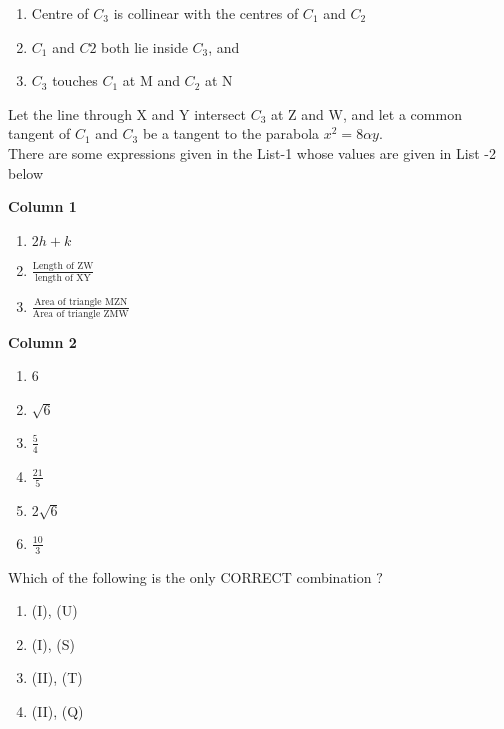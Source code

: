 \begin{enumerate}
 
 \begin{enumerate}[label=(\roman*)]
 \item Centre of $C_{3}$ is collinear with the centres of $C_{1}$ and $C_{2}$
 \item $C_{1}$ and $C{2}$ both lie inside $C_{3}$,  and

 \item $C_{3}$ touches $C_{1}$ at M and $C_{2}$ at N
\end{enumerate}
Let the line through X and Y intersect $C_{3}$ at Z and W,  and let a common tangent of $C_{1}$ and $C_{3}$ be a tangent to the parabola $x^2=8\alpha y.$\\

There are some expressions given in the List-1 whose values are given in List -2 below
\newpage
			
\begin{multicols}{2}
\textbf{Column 1}
\begin{enumerate}[label=(\Alph*)]           
\item $2h+k$                                  
\item $\frac{\text{Length of ZW}}{\text{length of XY}}$     
\item $\frac{\text{Area of triangle MZN}}{\text{Area of triangle ZMW}}$                     
\end{enumerate}
\columnbreak
 \textbf{Column 2}
 \begin{enumerate}[label=(\alph*),  start=16]
 \item 6
 \item $\sqrt{6}$
 \item $\frac{5}{4}$                           
 \item $\frac{21}{5}$                          
 \item $2\sqrt{6}$                             
 \item $\frac{10}{3}$                         
 \end{enumerate}
\end{multicols}
		
 Which of the following is the only CORRECT combination $?$
\begin{enumerate}[label=(\alph*)]  

\item (I), (U)
\item (I), (S)
 \item (II), (T)    
 \item (II), (Q)

 \end{enumerate}



\end{enumerate}

